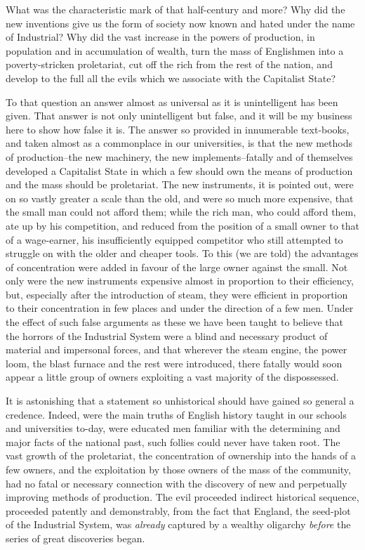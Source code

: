 \documentclass{book}
\begin{document}
What was the characteristic mark of that half-century and more? Why did the new inventions give us the form of society now known and hated under the name of Industrial? Why did the vast increase in the powers of production, in population and in accumulation of wealth, turn the mass of Englishmen into a poverty-stricken proletariat, cut off the rich from the rest of the nation, and develop to the full all the evils which we associate with the Capitalist State?

To that question an answer almost as universal as it is unintelligent has been given. That answer is not only unintelligent but false, and it will be my business here to show how false it is. The answer so provided in innumerable text-books, and taken almost as a commonplace in our universities, is that the new methods of production–the new machinery, the new implements–fatally and of themselves developed a Capitalist State in which a few should own the means of production and the mass should be proletariat. The new instruments, it is pointed out, were on so vastly greater a scale than the old, and were so much more expensive, that the small man could not afford them; while the rich man, who could afford them, ate up by his competition, and reduced from the position of a small owner to that of a wage-earner, his insufficiently equipped competitor who still attempted to struggle on with the older and cheaper tools. To this (we are told) the advantages of concentration were added in favour of the large owner against the small. Not only were the new instruments expensive almost in proportion to their efficiency, but, especially after the introduction of steam, they were efficient in proportion to their concentration in few places and under the direction of a few men. Under the effect of such false arguments as these we have been taught to believe that the horrors of the Industrial System were a blind and necessary product of material and impersonal forces, and that wherever the steam engine, the power loom, the blast furnace and the rest were introduced, there fatally would soon appear a little group of owners exploiting a vast majority of the dispossessed.

It is astonishing that a statement so unhistorical should have gained so general a credence. Indeed, were the main truths of English history taught in our schools and universities to-day, were educated men familiar with the determining and major facts of the national past, such follies could never have taken root. The vast growth of the proletariat, the concentration of ownership into the hands of a few owners, and the exploitation by those owners of the mass of the community, had no fatal or necessary connection with the discovery of new and perpetually improving methods of production. The evil proceeded indirect historical sequence, proceeded patently and demonstrably, from the fact that England, the seed-plot of the Industrial System, was \emph{already} captured by a wealthy oligarchy \emph{before} the series of great discoveries began.
\end{document}
